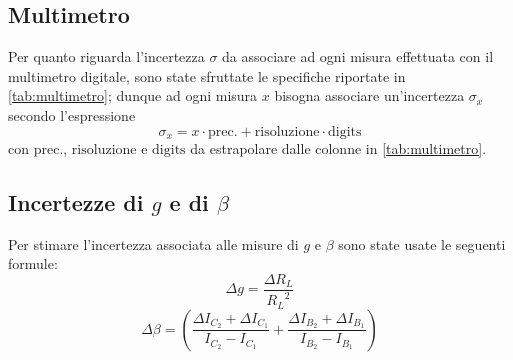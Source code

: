 \subsection{Multimetro}
Per quanto riguarda l'incertezza $\sigma$ da associare ad ogni misura effettuata con il multimetro digitale, sono state sfruttate le specifiche riportate in \autoref{tab:multimetro}; dunque ad ogni misura $x$ bisogna associare un'incertezza $\sigma_x$ secondo l'espressione
\begin{equation*}
    \sigma_x = x \cdot \text{prec.} + \text{risoluzione} \cdot \text{digits} 
\end{equation*}
con $\text{prec.}$, $\text{risoluzione}$ e $\text{digits}$ da estrapolare dalle colonne in \autoref{tab:multimetro}.

\subsection[Incertezze di g e di beta]{Incertezze di $g$ e di $\beta$}
Per stimare l'incertezza associata alle misure di $g$ e $\beta$ sono state usate le seguenti formule:
\begin{equation*}
    \Delta g = \dfrac{\Delta R_L}{{R_L}^2}
\end{equation*}
\begin{equation*}
    \Delta\beta = \left(\dfrac{\Delta I_{C_2} + \Delta I_{C_1}}{ I_{C_2} - I_{C_1}} + \dfrac{\Delta I_{B_2} + \Delta I_{B_1}}{ I_{B_2} - I_{B_1}}\right)
\end{equation*} 
